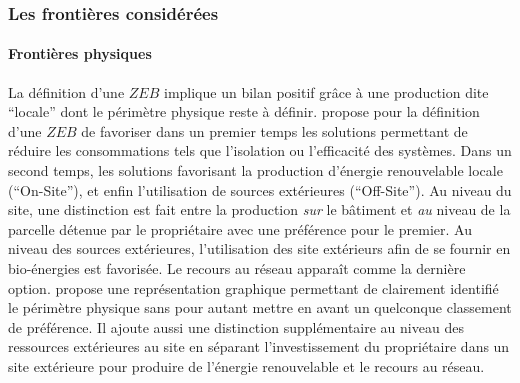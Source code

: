 \subsubsection{Les frontières considérées} %
\label{ssub:les_frontieres_considerees}
\paragraph{Frontières physiques} %
\label{par:frontières_physiques}
La définition d’une $ZEB$ implique un bilan positif grâce à une production dite
\enquote{locale} dont le périmètre physique reste à définir.
\textcite{Torcellini2006} propose pour la définition d’une $ZEB$
de favoriser dans un premier temps les solutions permettant de réduire les consommations
tels que l’isolation ou l’efficacité des systèmes. Dans un second temps, les solutions favorisant
la production d’énergie renouvelable locale (\enquote{On-Site}), et enfin
l’utilisation de sources extérieures (\enquote{Off-Site}). Au niveau du site, une
distinction est fait entre la production \emph{sur} le bâtiment et \emph{au} niveau de la
parcelle détenue par le propriétaire avec une préférence pour le premier.
Au niveau des sources extérieures, l’utilisation des site extérieurs afin de se
fournir en bio-énergies est favorisée. Le recours au réseau apparaît comme la dernière option.
\textcite{Marszal2010} propose une représentation graphique permettant de clairement
identifié le périmètre physique sans pour autant mettre en avant un quelconque
classement de préférence. Il ajoute aussi une distinction supplémentaire au niveau
des ressources extérieures au site en séparant l’investissement du propriétaire dans
un site extérieure pour produire de l’énergie renouvelable et le recours au réseau.

